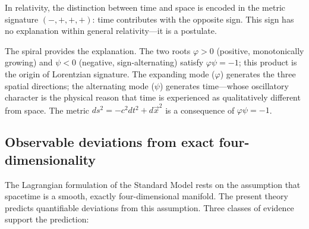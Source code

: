 \documentclass[12pt,a4paper]{article}
\begin{document}
In relativity, the distinction between time and space is encoded in the metric signature $(-, +, +, +)$: time contributes with the opposite sign. This sign has no explanation within general relativity---it is a postulate.

The spiral provides the explanation. The two roots $\varphi > 0$ (positive, monotonically growing) and $\psi < 0$ (negative, sign-alternating) satisfy $\varphi\psi = -1$; this product is the origin of Lorentzian signature. The expanding mode ($\varphi$) generates the three spatial directions; the alternating mode ($\psi$) generates time---whose oscillatory character is the physical reason that time is experienced as qualitatively different from space. The metric $ds^2 = -c^2 dt^2 + d\vec{x}^2$ is a consequence of $\varphi\psi = -1$.

\subsection{Observable deviations from exact four-dimensionality}
\label{sec:smooth-critique}

The Lagrangian formulation of the Standard Model rests on the assumption that spacetime is a smooth, exactly four-dimensional manifold. The present theory predicts quantifiable deviations from this assumption. Three classes of evidence support the prediction:
\end{document}
